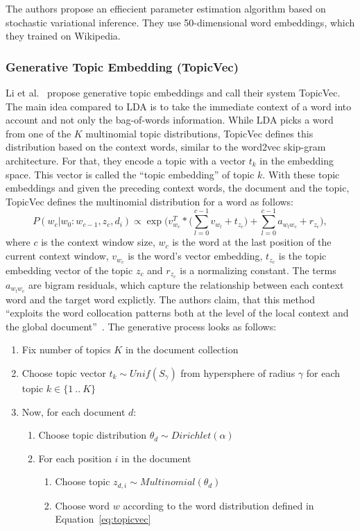 \documentclass[
        a4paper,
        titlepage,
        twoside,
        parskip,
        numbers=noenddot
        ]{scrbook}
\theoremstyle{break}
\begin{document}
The authors propose an effiecient parameter estimation algorithm based on stochastic variational inference.
They use 50-dimensional word embeddings, which they trained on Wikipedia.

\subsubsection{Generative Topic Embedding (TopicVec)}
Li et al.~\cite{Li2016} propose generative topic embeddings and call their system TopicVec.
The main idea compared to LDA is to take the immediate context of a word into account and not only the bag-of-words information.
While LDA picks a word from one of the $K$ multinomial topic distributions, TopicVec defines this distribution based on the context words, similar to the word2vec skip-gram architecture.
For that, they encode a topic with a vector $t_k$ in the embedding space.
This vector is called the ``topic embedding'' of topic $k$.
With these topic embeddings and given the preceding context words, the document and the topic, TopicVec defines the multinomial distribution for a word as follows:
\begin{equation}
  \label{eq:topicvec}
  P(w_c | w_0 : w_{c - 1}, z_c, d_i) \propto \exp \bigg( v_{w_{c}}^T * \Big( \sum\limits_{l=0}^{c-1} v_{w_l} + t_{z_c} \Big) + \sum\limits_{l=0}^{c - 1} a_{w_{l} w_c}  + r_{z_c} \bigg),
\end{equation}
where $c$ is the context window size, $w_c$ is the word at the last position of the current context window, $v_{w_c}$ is the word's vector embedding, $t_{z_c}$ is the topic embedding vector of the topic $z_c$ and $r_{z_c}$ is a normalizing constant.
The terms $a_{w_l w_c}$ are bigram residuals, which capture the relationship between each context word and the target word explictly.
The authors claim, that this method ``exploits the word collocation patterns both at the level of the local context and the global document''~\cite{Li2016}.
The generative process looks as follows:
\begin{enumerate}
    \item Fix number of topics $K$ in the document collection
    \item Choose topic vector $t_k \sim Unif(S_{\gamma})$ from hypersphere of radius $\gamma$ for each topic $k \in \{1~..~K\}$
    \item Now, for each document $d$:
    \begin{enumerate}
        \item Choose topic distribution $\theta_d \sim Dirichlet(\alpha)$
        \item For each position $i$ in the document
        \begin{enumerate}
            \item Choose topic $z_{d,i} \sim Multinomial(\theta_d)$
            \item Choose word $w$ according to the word distribution defined in Equation~\ref{eq:topicvec}
        \end{enumerate}
    \end{enumerate}
\end{enumerate}
\end{document}
